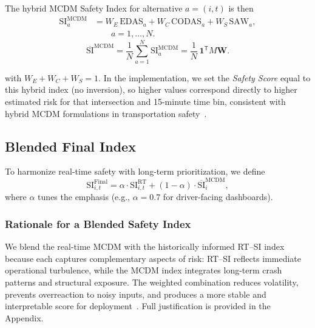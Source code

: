 \documentclass[conference]{IEEEtran}
\begin{document}
The hybrid MCDM Safety Index for alternative $a = (i,t)$ is then
\begin{equation}
\begin{aligned}
\mathrm{SI}^{\mathrm{MCDM}}_a
&=
W_E \,\mathrm{EDAS}_a
+
W_C \,\mathrm{CODAS}_a
+
W_S \,\mathrm{SAW}_a,
\\[4pt]
&\qquad a = 1,\ldots,N.
\end{aligned}
\end{equation}
\begin{equation}
\overline{\mathrm{SI}}^{\mathrm{MCDM}}
=
\frac{1}{N}
\sum_{a=1}^{N}
\mathrm{SI}^{\mathrm{MCDM}}_a
=
\frac{1}{N}\,\mathbf{1}^{\mathsf{T}} M \mathbf{W}.
\end{equation}

with $W_E + W_C + W_S = 1$. In the implementation, we set the
\emph{Safety Score} equal to this hybrid index (no inversion), so higher values
correspond directly to higher estimated risk for that intersection and
15-minute time bin, consistent with hybrid MCDM formulations in transportation
safety~\cite{Amraji2025CombinedSafetyIndex}.

\subsection{Blended Final Index}
To harmonize real-time safety with long-term prioritization, we define
\begin{equation}
\label{eq:blended-final}
\mathrm{SI}^{\text{Final}}_{i,t} = \alpha \cdot \mathrm{SI}^{\text{RT}}_{i,t} +
(1-\alpha)\cdot \overline{\mathrm{SI}}^{\text{MCDM}}_i,
\end{equation}
where $\alpha$ tunes the emphasis (e.g., $\alpha=0.7$ for driver-facing dashboards).

\subsubsection{Rationale for a Blended Safety Index}

We blend the real-time MCDM with the historically informed RT–SI index because each captures complementary aspects of risk: RT–SI reflects immediate operational turbulence, while the MCDM index integrates long-term crash patterns and structural exposure. The weighted combination reduces volatility, prevents overreaction to noisy inputs, and produces a more stable and interpretable score for deployment~\cite{montella2020systemic, Amraji2025CombinedSafetyIndex}. Full justification is provided in the Appendix.
\end{document}

